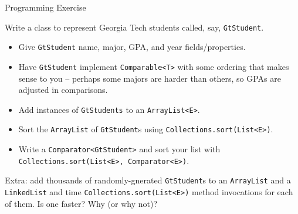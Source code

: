\documentclass{beamer}
\begin{document}
\begin{frame}[fragile]{Programming Exercise}

Write a class to represent Georgia Tech students called, say, {\tt GtStudent}.
\begin{itemize}
\item Give {\tt GtStudent} name, major, GPA, and year fields/properties.
\item Have {\tt GtStudent} implement {\tt Comparable<T>} with some ordering that makes sense to you -- perhaps some majors are harder than others, so GPAs are adjusted in comparisons.
\item Add instances of {\tt GtStudents} to an {\tt ArrayList<E>}.
\item Sort the {\tt ArrayList} of {\tt GtStudent}s using {\tt Collections.sort(List<E>)}.
\item Write a {\tt Comparator<GtStudent>} and sort your list with {\tt Collections.sort(List<E>, Comparator<E>)}.
\end{itemize}
Extra: add thousands of randomly-gnerated {\tt GtStudent}s to an {\tt ArrayList} and a {\tt LinkedList} and time {\tt Collections.sort(List<E>)} method invocations for each of them.  Is one faster?  Why (or why not)?

\end{frame}








\end{document}
